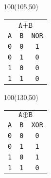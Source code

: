 \documentclass[aspectratio=169]{beamer}
\begin{document}
\begin{frame}[fragile,t]
    \begin{textblock}{100}(105,50)
    \begin{tabular}{cc|c}
    \multicolumn{3}{c}{\textcolor{naranjauca}{ $\overline{\texttt{A}+\texttt{B}}$ } } \\
    \texttt{A} & \texttt{B} & \texttt{NOR} \\
    \hline
    \texttt{0} & \texttt{0} & \texttt{1} \\
    \texttt{0} & \texttt{1} & \texttt{0} \\
    \texttt{1} & \texttt{0} & \texttt{0} \\
    \texttt{1} & \texttt{1} & \texttt{0} \\
    \end{tabular}
    \end{textblock}
    \begin{textblock}{100}(130,50)
    \begin{tabular}{cc|c}
    \multicolumn{3}{c}{\textcolor{naranjauca}{ $\texttt{A}\oplus\texttt{B}$ } } \\
    \texttt{A} & \texttt{B} & \texttt{XOR} \\
    \hline
    \texttt{0} & \texttt{0} & \texttt{0} \\
    \texttt{0} & \texttt{1} & \texttt{1} \\
    \texttt{1} & \texttt{0} & \texttt{1} \\
    \texttt{1} & \texttt{1} & \texttt{0} \\
    \end{tabular}
    \end{textblock}
\end{frame}
\end{document}
